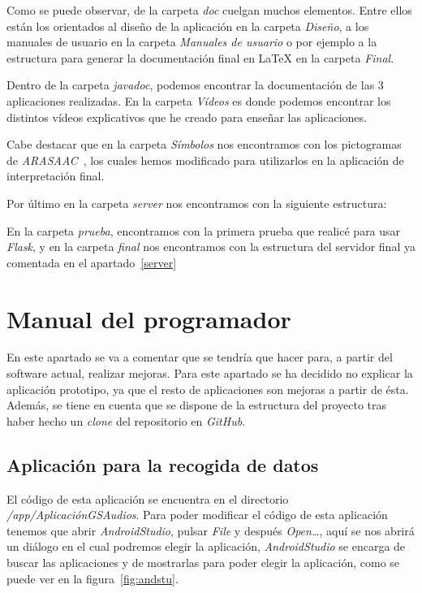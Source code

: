 Como se puede observar, de la carpeta \textit{doc} cuelgan muchos elementos. Entre ellos están los orientados al diseño de la aplicación en la carpeta \textit{Diseño}, a los manuales de usuario en la carpeta \textit{Manuales de usuario} o por ejemplo a la estructura para generar la documentación final en \LaTeX{} en la carpeta \textit{Final}.

Dentro de la carpeta \textit{javadoc}, podemos encontrar la documentación de las 3 aplicaciones realizadas. En la carpeta \textit{Vídeos} es donde podemos encontrar los distintos vídeos explicativos que he creado para enseñar las aplicaciones.

Cabe destacar que en la carpeta \textit{Símbolos} nos encontramos con los pictogramas de \textit{ARASAAC}~\cite{arasaac}, los cuales hemos modificado para utilizarlos en la aplicación de interpretación final.

Por último en la carpeta \textit{server} nos encontramos con la siguiente estructura:

En la carpeta \textit{prueba}, encontramos con la primera prueba que realicé para usar \textit{Flask}, y en la carpeta \textit{final} nos encontramos con la estructura del servidor final ya comentada en el apartado~\ref{server}
\section{Manual del programador}
En este apartado se va a comentar que se tendría que hacer para, a partir del software actual, realizar mejoras. Para este apartado se ha decidido no explicar la aplicación prototipo, ya que el resto de aplicaciones son mejoras a partir de ésta. Además, se tiene en cuenta que se dispone de la estructura del proyecto tras haber hecho un \textit{clone} del repositorio en \textit{GitHub}.
\subsection{Aplicación para la recogida de datos}
El código de esta aplicación se encuentra en el directorio \textit{/app/AplicaciónGSAudios}. Para poder modificar el código de esta aplicación tenemos que abrir \textit{AndroidStudio}, pulsar \textit{File} y después \textit{Open\ldots}, aquí se nos abrirá un diálogo en el cual podremos elegir la aplicación, \textit{AndroidStudio} se encarga de buscar las aplicaciones y de mostrarlas para poder elegir la aplicación, como se puede ver en la figura~\ref{fig:andstu}.

